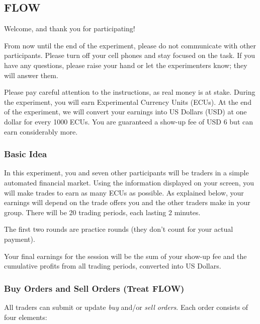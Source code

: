 \subsection{FLOW} \label{app_instruction_flow}
Welcome, and thank you for participating!

From now until the end of the experiment, please do not communicate with
other participants. Please turn off your cell phones and stay focused on
the task. If you have any questions, please raise your hand or let the
experimenters know; they will answer them.

Please pay careful attention to the instructions, as real money is at
stake. During the experiment, you will earn Experimental Currency Units
(ECUs). At the end of the experiment, we will convert your earnings into
US Dollars (USD) at one dollar for every 1000 ECUs. You are guaranteed a
show-up fee of USD 6 but can earn considerably more.

\subsubsection*{Basic Idea}\label{basic-idea_flow}

In this experiment, you and seven other participants will be traders in
a simple automated financial market. Using the information displayed on
your screen, you will make trades to earn as many ECUs as possible. As
explained below, your earnings will depend on the trade offers you and
the other traders make in your group. There will be 20 trading periods,
each lasting 2 minutes.

The first two rounds are practice rounds (they don't count for your actual payment).

Your final earnings for the session will be the sum of your show-up fee
and the cumulative profits from all trading periods, converted into US
Dollars.

\subsubsection*{Buy Orders and Sell Orders (Treat
FLOW)}\label{buy-orders-and-sell-orders-treat-flow}

All traders can submit or update \emph{buy} and/or \emph{sell orders}.
Each order consists of four elements:

